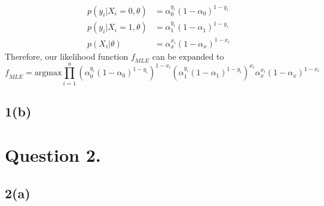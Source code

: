 \documentclass{report}
\theoremstyle{definition}
\begin{document}
\begin{equation*}
    \begin{aligned}
        &p(y_i|X_i = 0, \theta) &= \alpha_{0}^{y_i}(1-\alpha_0)^{1-y_i}\\
        &p(y_i|X_i = 1, \theta) &= \alpha_{1}^{y_i}(1-\alpha_1)^{1-y_i}\\
        &p(X_i|\theta) &= \alpha_{x}^{x_i}(1-\alpha_{x})^{1-x_i}
    \end{aligned}
\end{equation*}
Therefore, our likelihood function $\mathit{f}_{MLE}$ can be $\text{expanded}$ to
\begin{equation*}
    \mathit{f}_{MLE} = \text{argmax}\prod_{i = 1}^{n}(\alpha_{0}^{y_i}(1-\alpha_0)^{1-y_i})^{1-x_i}(\alpha_{1}^{y_i}(1-\alpha_1)^{1-y_i})^{x_i}\alpha_{x}^{x_i}(1-\alpha_{x})^{1-x_i}
\end{equation*}
\subsection*{1(b)}
\section*{Question 2.}
\subsection*{2(a)}
\end{document}
